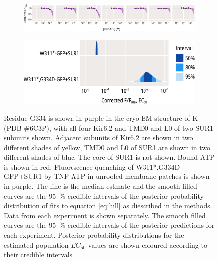 \begin{figure}[hbtp]
\begin{subfigure}[t]{0.45\textwidth}
	\end{subfigure}
	\vfill
	\begin{subfigure}[t]{0.9\textwidth}
		\caption{}\label{ch5fig:g334d_indfits}
		\centering
		\includegraphics[width=\textwidth]{g334d_3.pdf}
	\end{subfigure}
	\vfill
	\begin{subfigure}[t]{0.7\textwidth}
		\caption{}\label{ch5fig:g334d_params}
		\centering
		\includegraphics[width=\textwidth]{g334d_4.pdf}
	\end{subfigure}
	\caption[G334D abolishes nucleotide binding at Kir6.2]{
	 Residue G334 is shown in purple in the cryo-EM structure of K\ATP{} (PDB \#6C3P), with all four Kir6.2 and TMD0 and L0 of two SUR1 subunits shown.
	Adjacent subunits of Kir6.2 are shown in two different shades of yellow, TMD0 and L0 of SUR1 are shown in two different shades of blue.
	The core of SUR1 is not shown.
	Bound ATP is shown in red.
	 Fluorescence quenching of W311*,G334D-GFP+SUR1 by TNP-ATP in unroofed membrane patches is shown in purple.
	The line is the median estmate and the smooth filled curves are the \SI{95}{\percent} credible intervals of the posterior probability distribution of fits to equation \ref{eq:hill} as diescribed in the methods.
	 Data from each experiment is shown separately.
	The smooth filled curves are the \SI{95}{\percent} credible intervals of the posterior predictions for each experiment.
	 Posterior probability distributions for the estimated population $EC_{50}$ values are shown coloured according to their credible intervals.
	}\label{ch5fig:g334d}
\end{figure}

